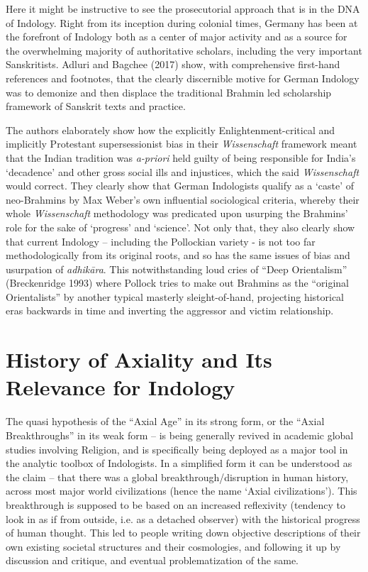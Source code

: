 Here it might be instructive to see the prosecutorial approach that is in the DNA of Indology. Right from its inception during colonial times, Germany has been at the forefront of Indology both as a center of major activity and as a source for the overwhelming majority of authoritative scholars, including the very important Sanskritists. Adluri and Bagchee (2017) show, with comprehensive first-hand references and footnotes, that the clearly discernible motive for German Indology was to demonize and then displace the traditional Brahmin led scholarship framework of Sanskrit texts and practice.

The authors elaborately show how the explicitly Enlightenment-critical and implicitly Protestant supersessionist bias in their \textit{Wissenschaft} framework meant that the Indian tradition was \textit{a-priori} held guilty of being responsible for India’s ‘decadence’ and other gross social ills and injustices, which the said \textit{Wissenschaft} would correct. They clearly show that German Indologists qualify as a ‘caste’ of neo-Brahmins by Max Weber’s own influential sociological criteria, whereby their whole \textit{Wissenschaft} methodology was predicated upon usurping the Brahmins’ role for the sake of ‘progress’ and ‘science’. Not only that, they also clearly show that current Indology – including the Pollockian variety - is not too far methodologically from its original roots, and so has the same issues of bias and usurpation of \textit{adhikāra}. This notwithstanding loud cries of “Deep Orientalism” (Breckenridge 1993) where Pollock tries to make out Brahmins as the “original Orientalists” by another typical masterly sleight-of-hand, projecting historical eras backwards in time and inverting the aggressor and victim relationship.


\section*{History of Axiality and Its Relevance for Indology}

The quasi hypothesis of the “Axial Age” in its strong form, or the “Axial Breakthroughs” in its weak form – is being generally revived in academic global studies involving Religion, and is specifically being deployed as a major tool in the analytic toolbox of Indologists. In a simplified form it can be understood as the claim – that there was a global breakthrough/disruption in human history, across most major world civilizations (hence the name ‘Axial civilizations’). This breakthrough is supposed to be based on an increased reflexivity (tendency to look in as if from outside, i.e. as a detached observer) with the historical progress of human thought. This led to people writing down objective descriptions of their own existing societal structures and their cosmologies, and following it up by discussion and critique, and eventual problematization of the same.

